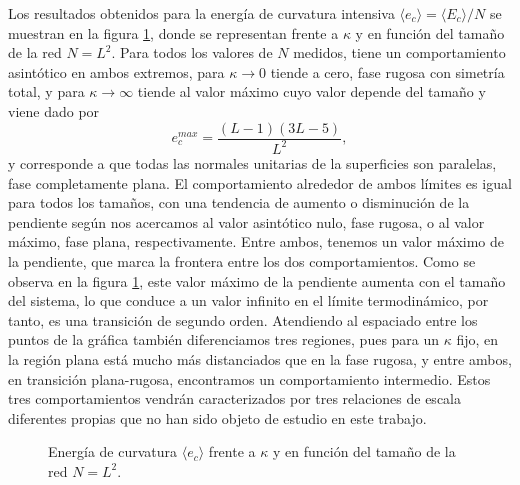 Los resultados obtenidos para la energía de curvatura intensiva $\langle
e_c\rangle=\langle E_c\rangle/N$ se muestran en la figura \ref{Ec_fig}, donde
se representan frente a $\kappa$ y en función del tamaño de la red
$N=L^2$. Para todos los valores de $N$ medidos, tiene un comportamiento
asintótico en ambos extremos, para $\kappa\rightarrow 0$ tiende a cero, fase
rugosa con simetría total, y para $\kappa\rightarrow \infty$ tiende al valor
máximo cuyo valor depende del tamaño y viene dado por 
\begin{equation}
e^{max}_c = \frac{(L-1)(3L-5)}{L^2},
\end{equation}
y corresponde a que todas las normales unitarias de la superficies son
paralelas, fase completamente plana. El comportamiento alrededor de ambos
límites es igual para todos los tamaños, con una tendencia de aumento o
disminución de la pendiente según nos acercamos al valor asintótico nulo, fase
rugosa, o al valor máximo, fase plana, respectivamente. Entre ambos, tenemos un valor máximo de
la pendiente, que marca la frontera entre los dos comportamientos. Como se
observa en la figura \ref{Ec_fig}, este valor máximo de la pendiente aumenta
con el tamaño del sistema, lo que conduce a un valor infinito en el límite
termodinámico, por tanto, es una transición de segundo orden. Atendiendo al
espaciado entre los puntos de la gráfica también diferenciamos tres regiones, pues para un
$\kappa$ fijo, en la región plana está mucho más distanciados que en la fase
rugosa, y entre ambos, en transición plana-rugosa, encontramos un
comportamiento intermedio. Estos tres comportamientos vendrán caracterizados por tres
relaciones de escala diferentes propias que no han sido objeto de estudio en
este trabajo.

\begin{figure}[h]
\centering
 
\caption{Energía de curvatura $\langle e_c\rangle$ frente a $\kappa$ y en función del tamaño de la red
$N=L^2$.}\label{Ec_fig}
\end{figure}

